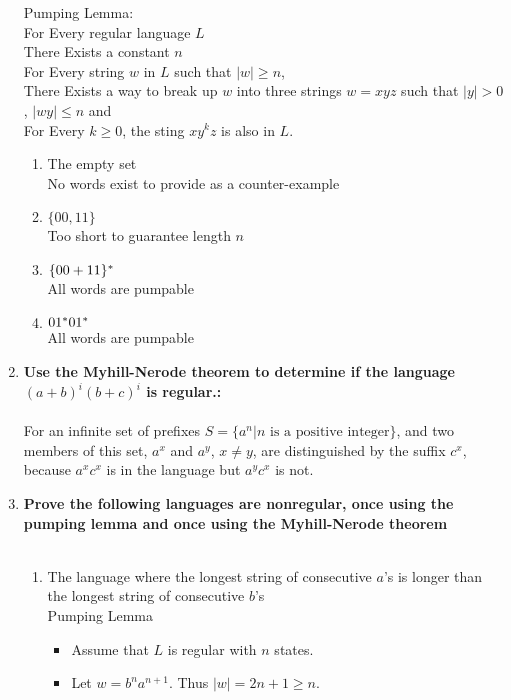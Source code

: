 \begin{enumerate}
Pumping Lemma:\\
For Every regular language $L$\\
There Exists a constant $n$\\
For Every  string $w$ in $L$ such that $|w| \geq n$,\\
There Exists a way to break up $w$ into three strings $w=xyz$ such that $|y|>0$, $|wy| \leq n$ and \\
For Every $k \geq 0$, the sting $xy^kz$ is also in  $L$.\\
\begin{enumerate}
	\item The empty set
	\\ No words exist to provide as a counter-example
	
	\item $\{00,11\}$
	\\  Too short to guarantee length $n$
	
	\item $\{00+11\}{}^\ast$
	\\ All words are pumpable
	\item $01{}^\ast 01 {}^\ast$
		\\ All words are pumpable
\end{enumerate}


\newpage
\item \textbf{Use the Myhill-Nerode theorem to determine if the language $(a+b)^i (b+c)^i$ is regular.:}
\\\\
For an infinite set of prefixes $S = \{a^n | n \text{ is a positive integer}\}$, and two members of this set, $a^x$ and $a^y$, $x \neq y$, are distinguished by the suffix $c^x$, because $a^xc^x$ is in the language but $a^yc^x$ is not.
\newpage
\item \textbf{Prove the following languages are nonregular, once using the pumping lemma and once using the Myhill-Nerode theorem}
\\\\
\begin{enumerate}
	\item The language where the longest string of consecutive $a$'s is longer than the longest string of consecutive $b$'s
	\\Pumping Lemma
		  	\begin{itemize}
		\item 	Assume that $L$ is regular with $n$ states.  	
		\item Let $w = b^na^{n+1}$.  Thus $|w| = 2n  + 1 \geq n$.
		

\end{itemize}
\end{enumerate}
\end{enumerate}
